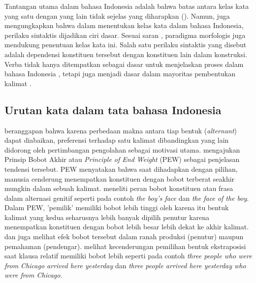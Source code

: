Tantangan utama dalam bahasa Indonesia adalah bahwa batas antara kelas kata yang satu dengan yang lain tidak sejelas yang diharapkan (\citealp{kridalaksana2002struktur, achmad2013linguistik}). Namun, \cite{kridalaksana2002struktur} juga mengungkapkan bahwa dalam menentukan kelas kata dalam bahasa Indonesia, perilaku sintaktis dijadikan ciri dasar. Sesuai saran \cite{robins1985linguistics}, paradigma morfologis juga mendukung penentuan kelas kata ini. Salah satu perilaku sintaktis yang disebut \cite{kridalaksana2002struktur} adalah dependensi konstituen tersebut dengan konstituen lain dalam konstruksi. Verba tidak hanya ditempatkan sebagai dasar untuk menjelaskan proses dalam bahasa Indonesia \citep{demena2008bahasa}, tetapi juga menjadi dasar dalam mayoritas pembentukan kalimat \citep{kridalaksana1999deskriptif}.

\subsection{Urutan kata dalam tata bahasa Indonesia}
\cite{wasow2002postverbal} beranggapan bahwa karena perbedaan makna antara tiap bentuk (\textit{alternant}) dapat diabaikan, preferensi terhadap satu kalimat dibandingkan yang lain didorong oleh  pertimbangan pengolahan sebagai motivasi utama. \cite{wasow2002postverbal} mengajukan Prinsip Bobot Akhir atau \textit{Principle of End Weight} (PEW) sebagai penjelasan tendensi tersebut. PEW menyatakan bahwa saat dihadapkan dengan pilihan, manusia cenderung menempatkan konstituen dengan bobot terberat seakhir mungkin dalam sebuah kalimat. \cite{rosenbach2005animacy} meneliti peran bobot konstituen atau frasa dalam alternasi genitif seperti pada contoh \textit{the boy's face} dan \textit{the face of the boy}. Dalam PEW, 'pemilik' memiliki bobot lebih tinggi oleh karena itu bentuk kalimat yang kedua seharusnya lebih banyak dipilih penutur karena menempatkan konstituen dengan bobot lebih besar lebih dekat ke akhir kalimat. \cite{francis2010grammatical} dan \cite{rosenbach2005animacy} juga melihat efek bobot tersebut dalam ranah produksi (penutur) maupun pemahaman (pendengar). \cite{francis2010grammatical} melihat kecenderungan pemilihan bentuk ekstraposisi saat klausa relatif memiliki bobot lebih seperti pada contoh \textit{three people who were from Chicago arrived here yesterday} dan \textit{three people arrived here yesterday who were from Chicago}.

